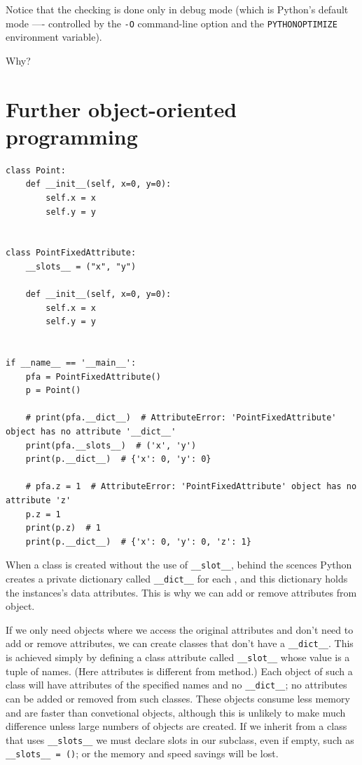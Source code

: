 \begin{tcolorbox}
  Notice that the checking is done only in debug mode
  (which is Python’s default mode —-
  controlled by the \verb|-O| command-line option and the \verb|PYTHONOPTIMIZE| environment variable).

  Why?
\end{tcolorbox}


\section{Further object-oriented programming}

\begin{lstlisting}
class Point:
    def __init__(self, x=0, y=0):
        self.x = x
        self.y = y


class PointFixedAttribute:
    __slots__ = ("x", "y")

    def __init__(self, x=0, y=0):
        self.x = x
        self.y = y


if __name__ == '__main__':
    pfa = PointFixedAttribute()
    p = Point()

    # print(pfa.__dict__)  # AttributeError: 'PointFixedAttribute' object has no attribute '__dict__'
    print(pfa.__slots__)  # ('x', 'y')
    print(p.__dict__)  # {'x': 0, 'y': 0}

    # pfa.z = 1  # AttributeError: 'PointFixedAttribute' object has no attribute 'z'
    p.z = 1
    print(p.z)  # 1
    print(p.__dict__)  # {'x': 0, 'y': 0, 'z': 1} 
\end{lstlisting}

When a class is created without the use of \verb|__slot__|,
behind the scences Python creates a private dictionary called \verb|__dict__| for each , and
this dictionary holds the instances's data attributes.
This is why we can add or remove attributes from object.


If we only need objects where we access the original attributes and don't need to add or remove attributes,
we can create classes that don't have a \verb|__dict__|.
This is achieved simply by defining a class attribute called \verb|__slot__| whose value is a tuple of  names.
(Here attributes is different from method.)
Each object of such a class will have attributes of the specified names and no \verb|__dict__|;
no attributes can be added or removed from such classes.
These objects consume less memory and are faster than convetional objects,
although this is unlikely to make much difference unless large numbers of objects are created.
If we inherit from a class that uses \verb|__slots__| we must declare slots in our subclass,
even if empty, such as \verb|__slots__ = ()|; or the memory and speed savings will be lost.




